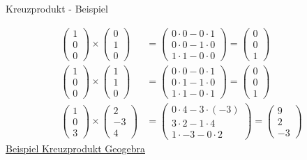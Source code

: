 \begin{frame}{Kreuzprodukt - Beispiel}
	
	\begin{align*}
	\begin{pmatrix}
	1 \\ 0 \\ 0
	\end{pmatrix} \times  \begin{pmatrix}
	0 \\ 1 \\ 0
	\end{pmatrix} & = \begin{pmatrix}
	0 \cdot 0 - 0 \cdot 1 \\
	0 \cdot 0 - 1 \cdot 0 \\
	1 \cdot 1 - 0 \cdot 0	
	\end{pmatrix} = \begin{pmatrix}
	0 \\ 0 \\ 1
	\end{pmatrix} \\
	\begin{pmatrix}
	1 \\ 0 \\ 0
	\end{pmatrix} \times  \begin{pmatrix}
	1 \\ 1 \\ 0
	\end{pmatrix} & = \begin{pmatrix}
	0 \cdot 0 - 0 \cdot 1 \\
	0 \cdot 1 - 1 \cdot 0 \\
	1 \cdot 1 - 0 \cdot 1	
	\end{pmatrix} = \begin{pmatrix}
	0 \\ 0 \\ 1
	\end{pmatrix} \\
	\begin{pmatrix}
		1 \\ 0 \\ 3
	\end{pmatrix} \times  \begin{pmatrix}
	2 \\ -3 \\ 4
	\end{pmatrix} & = \begin{pmatrix}
	0 \cdot 4 - 3 \cdot (-3) \\
	3 \cdot 2 - 1 \cdot 4 \\
	1 \cdot -3 - 0 \cdot 2	
	\end{pmatrix} = \begin{pmatrix}
	9 \\ 2 \\ -3
	\end{pmatrix}
	\end{align*}
{\scriptsize 	%
\href{https://fh-swf.sciebo.de/public.php?service=files&t=83c3e87e19f49991d0d6c55da10f8c7d}{Beispiel Kreuzprodukt Geogebra}
}\end{frame}

